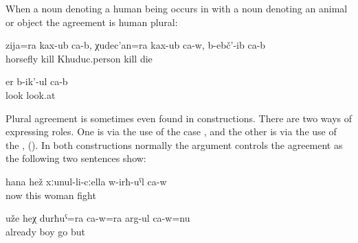 When a noun denoting a human being occurs in  with a noun denoting an animal or object the agreement is human plural:
%
\begin{exe}
	\ex	\label{ex:‎(The Sanzhi man shot) and killed the horsefly and he killed the Xuduc man, and (they both) died}
	\gll	zija=ra	kax-ub	ca-b,	χudec'an=ra	kax-ub	ca-w,	b-ebč'-ib	ca-b\\
		horsefly	kill		Khuduc.person	kill 	die	\\
	\glt	{}

	\ex	\label{ex:(The boy and the dog) are looking}
	\gll	er	b-ik'-ul	ca-b\\
		look	look.at	\\
	\glt	{}
\end{exe}

Plural agreement is sometimes even found in  constructions. There are two ways of expressing  roles. One is via the use of the  case ,  and the other is via the use of the  ,  (). In both constructions normally the  argument controls the agreement as the following two sentences show:
%
\begin{exe}
	\ex	\label{ex:Now he is fighting with this wife}
	\gll	hana	hež	xːunul-li-cːella	w-irħ-uˁl	ca-w\\
		now	this	woman	fight	\\
	\glt	{}

	\ex	\label{ex:He is already walking with this son}
	\gll	uže	heχ	durħuˁ=ra	ca-w=ra	arg-ul	ca-w=nu\\
		already		boy		go	but\\
	\glt	{}
\end{exe}

